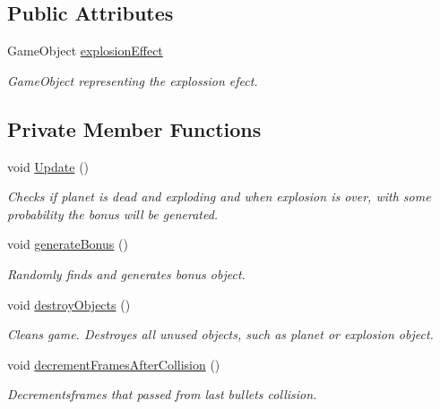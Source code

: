 \subsection*{Public Attributes}
\begin{DoxyCompactItemize}
\item 
Game\+Object \mbox{\hyperlink{class_planet_lifes_controller_a793b98df14aca219bbdeec8fa0a21688}{explosion\+Effect}}
\begin{DoxyCompactList}\small\item\em Game\+Object representing the explossion efect. \end{DoxyCompactList}\end{DoxyCompactItemize}
\subsection*{Private Member Functions}
\begin{DoxyCompactItemize}
\item 
void \mbox{\hyperlink{class_planet_lifes_controller_a55a364780e2e20cb157170ce5c3b534c}{Update}} ()
\begin{DoxyCompactList}\small\item\em Checks if planet is dead and exploding and when explosion is over, with some probability the bonus will be generated. \end{DoxyCompactList}\item 
void \mbox{\hyperlink{class_planet_lifes_controller_a5aaaacd44624d2fdebef0cd35a90e5a7}{generate\+Bonus}} ()
\begin{DoxyCompactList}\small\item\em Randomly finds and generates bonus object. \end{DoxyCompactList}\item 
void \mbox{\hyperlink{class_planet_lifes_controller_a4b17df4520f72b4006a25871bcd657cd}{destroy\+Objects}} ()
\begin{DoxyCompactList}\small\item\em Cleans game. Destroyes all unused objects, such as planet or explosion object. \end{DoxyCompactList}\item 
void \mbox{\hyperlink{class_planet_lifes_controller_acf21848a75efc48db45c5972cd732905}{decrement\+Frames\+After\+Collision}} ()
\begin{DoxyCompactList}\small\item\em Decrementsframes that passed from last bullet\textquotesingle{}s collision. \end{DoxyCompactList}\end{DoxyCompactItemize}
